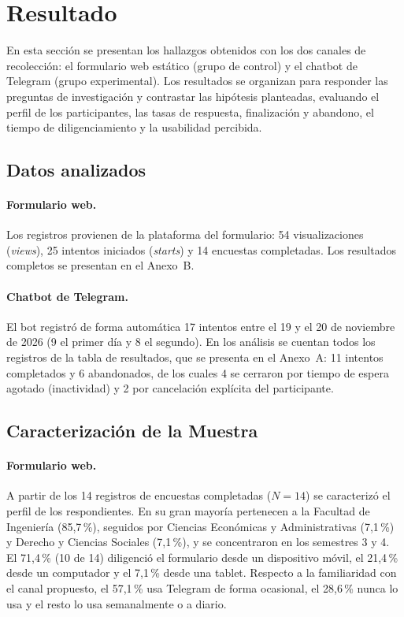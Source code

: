 \documentclass[12pt,letterpaper]{article}
\begin{document}
\section{Resultado}

En esta sección se presentan los hallazgos obtenidos con los dos canales de recolección: el formulario web estático (grupo de control) y el chatbot de Telegram (grupo experimental). Los resultados se organizan para responder las preguntas de investigación y contrastar las hipótesis planteadas, evaluando el perfil de los participantes, las tasas de respuesta, finalización y abandono, el tiempo de diligenciamiento y la usabilidad percibida.

\subsection{Datos analizados}

\paragraph{Formulario web.} Los registros provienen de la plataforma del formulario: 54 visualizaciones (\textit{views}), 25 intentos iniciados (\textit{starts}) y 14 encuestas completadas. Los resultados completos se presentan en el Anexo~B.

\paragraph{Chatbot de Telegram.} El bot registró de forma automática 17 intentos entre el 19 y el 20 de noviembre de 2026 (9 el primer día y 8 el segundo). En los análisis se cuentan todos los registros de la tabla de resultados, que se presenta en el Anexo~A: 11 intentos completados y 6 abandonados, de los cuales 4 se cerraron por tiempo de espera agotado (inactividad) y 2 por cancelación explícita del participante.

\subsection{Caracterización de la Muestra}

\paragraph{Formulario web.} A partir de los 14 registros de encuestas completadas ($N=14$) se caracterizó el perfil de los respondientes. En su gran mayoría pertenecen a la Facultad de Ingeniería (85,7\,\%), seguidos por Ciencias Económicas y Administrativas (7,1\,\%) y Derecho y Ciencias Sociales (7,1\,\%), y se concentraron en los semestres 3 y 4. El 71,4\,\% (10 de 14) diligenció el formulario desde un dispositivo móvil, el 21,4\,\% desde un computador y el 7,1\,\% desde una tablet. Respecto a la familiaridad con el canal propuesto, el 57,1\,\% usa Telegram de forma ocasional, el 28,6\,\% nunca lo usa y el resto lo usa semanalmente o a diario.
\end{document}
